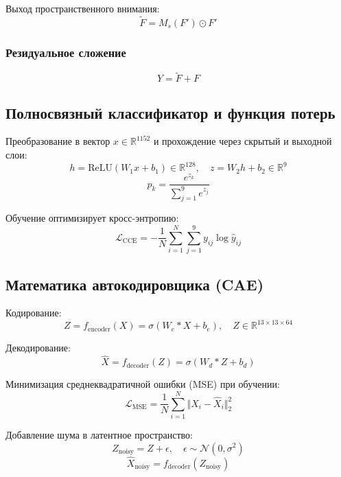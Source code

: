 \documentclass[11pt,a4paper]{article}
\begin{document}
Выход пространственного внимания:
\begin{equation}
\tilde{F} = M_s(F') \odot F'
\end{equation}

\subsubsection*{Резидуальное сложение}
\begin{equation}
Y = \tilde{F} + F
\end{equation}

\subsection{Полносвязный классификатор и функция потерь}
Преобразование в вектор $x \in \mathbb{R}^{1152}$ и прохождение через скрытый и выходной слои:
\begin{equation}
h = \text{ReLU}(W_1 x + b_1) \in \mathbb{R}^{128}, \quad z = W_2 h + b_2 \in \mathbb{R}^9
\end{equation}
\begin{equation}
p_k = \frac{e^{z_k}}{\sum_{j=1}^9 e^{z_j}}
\end{equation}

Обучение оптимизирует кросс-энтропию:
\begin{equation}
\mathcal{L}_{\text{CCE}} = - \frac{1}{N} \sum_{i=1}^N \sum_{j=1}^9 y_{ij} \log \hat{y}_{ij}
\end{equation}

\subsection{Математика автокодировщика (CAE)}
Кодирование:
\begin{equation}
Z = f_{\text{encoder}}(X) = \sigma(W_e * X + b_e), \quad Z \in \mathbb{R}^{13 \times 13 \times 64}
\end{equation}

Декодирование:
\begin{equation}
\hat{X} = f_{\text{decoder}}(Z) = \sigma(W_d * Z + b_d)
\end{equation}

Минимизация среднеквадратичной ошибки (MSE) при обучении:
\begin{equation}
\mathcal{L}_{\text{MSE}} = \frac{1}{N} \sum_{i=1}^N \Vert X_i - \hat{X}_i \Vert_2^2
\end{equation}

Добавление шума в латентное пространство:
\begin{equation}
Z_{\text{noisy}} = Z + \epsilon, \quad \epsilon \sim \mathcal{N}(0, \sigma^2)
\end{equation}
\begin{equation}
\hat{X}_{\text{noisy}} = f_{\text{decoder}}(Z_{\text{noisy}})
\end{equation}
\end{document}
